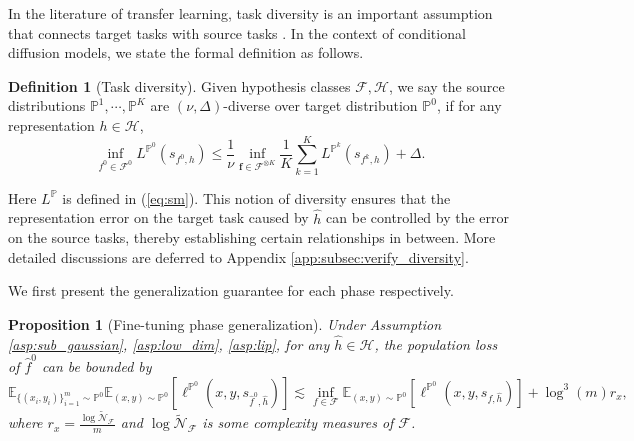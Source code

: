 \documentclass{article}
\numberwithin{equation}{section}
\def\eqref#1{equation~\ref{#1}}
\def\vf{{\bm{f}}}
\newcommand{\E}{\mathbb{E}}
\newtheorem{prop}[thm]{Proposition}
\theoremstyle{definition}
\newtheorem{definition}{Definition}[section]
\renewcommand{\P}{\mathbb{P}}
\renewcommand{\eqref}[1]{(\ref{#1})}
\begin{document}
In the literature of transfer learning, task diversity is an important assumption that connects target tasks with source tasks \citep{tripuraneni2020theory,du2020few,chua2021fine}.
In the context of conditional diffusion models, we state the formal definition as follows.
\begin{definition}[Task diversity]\label{def:diversity}
    Given hypothesis classes $\mathcal{F},\mathcal{H}$, we say the source distributions $\P^1,\cdots,\P^K$ are $(\nu,\Delta)$-diverse over target distribution $\P^{0}$, if for any representation $h\in\mathcal{H}$,
    \begin{equation}
        \inf_{f^0\in\mathcal{F}^0}L^{\P^0}(s_{f^0,h})\leq \frac{1}{\nu}\inf_{\vf\in\mathcal{F}^{\otimes K}}\frac{1}{K}\sum_{k=1}^K L^{\P^k}(s_{f^{k},h}) + \Delta.
    \end{equation}
\end{definition}
Here $L^\P$ is defined in \eqref{eq:sm}.
This notion of diversity ensures that the representation error on the target task caused by $\widehat{h}$ can be controlled by the error on the source tasks, thereby establishing certain relationships in between.
More detailed discussions are deferred to Appendix \ref{app:subsec:verify_diversity}.

We first present the generalization guarantee for each phase respectively.
\begin{prop}[Fine-tuning phase generalization]\label{prop:generalization_test_informal}
    Under Assumption \ref{asp:sub_gaussian}, \ref{asp:low_dim}, \ref{asp:lip}, for any $\widehat{h}\in\mathcal{H}$, the population loss of $\widehat{f}^0$ can be bounded by
    \begin{equation}
        \E_{\{(x_i,y_i)\}_{i=1}^m\sim \P^0} \E_{(x,y)\sim\P^0} [\ell^{\P^0}(x,y,s_{\widehat{f}^0,\widehat{h}})]\lesssim \inf_{f\in\mathcal{F}}\E_{(x,y)\sim\P^0}[\ell^{\P^0}(x,y,s_{f,\widehat{h}})] + \log^3(m) r_x,
    \end{equation}
    where $r_x=\frac{\log\widetilde{\mathcal{N}}_\mathcal{F}}{m}$ and $\log\widetilde{\mathcal{N}}_\mathcal{F}$ is some complexity measures of $\mathcal{F}$.
\end{prop}
\end{document}
